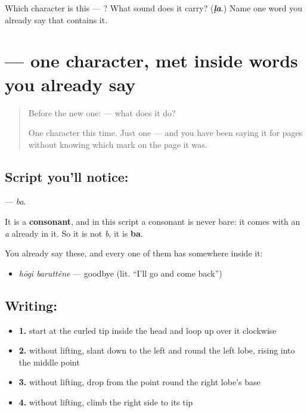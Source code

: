 \begin{tcolorbox}[breakable,colback=teal!4,colframe=teal!35!black,title={Before you move on}]
Which character is this — ? What sound does it carry? (\emph{\textbf{ḷa}}.) Name one word you already say that contains it.
\end{tcolorbox}
\section[\texorpdfstring{\kn{ಬ} (ba)}{ಬ (ba)}]{ — one character, met inside words you already say}

\label{lesson:KA-S110-letter-ba}



\begin{quote}
Before the new one:  — what does it do?

One character this time. Just one — and you have been saying it for pages without knowing which mark on the page it was.
\end{quote}

\subsection*{Script you'll notice: }
\textbf{} — \emph{ba}.

It is a \textbf{consonant}, and in this script a consonant is never bare: it comes with an \emph{a} already in it. So it is not \emph{b}, it is \textbf{ba}.

You already say these, and every one of them has  somewhere inside it:

\begin{itemize}
\raggedright
  \item \textbf{ } \emph{hōgi baruttēne} — goodbye (lit. \textquotedblleft{}I'll go and come back\textquotedblright{})
\end{itemize}

\subsection*{Writing: }

\begin{itemize}
\raggedright
  \item \textbf{1.} start at the curled tip inside the head and loop up over it clockwise
  \item \textbf{2.} without lifting, slant down to the left and round the left lobe, rising into the middle point
  \item \textbf{3.} without lifting, drop from the point round the right lobe's base
  \item \textbf{4.} without lifting, climb the right side to its tip
\end{itemize}

